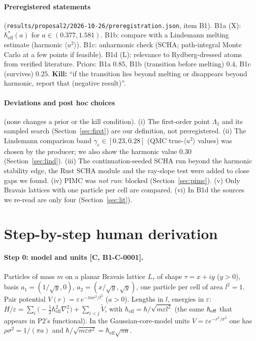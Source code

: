 \documentclass[10pt]{article}
\newcommand{\tier}[1]{\textsf{[#1]}}
\newcommand{\hb}{\hbar_{\mathrm{eff}}}
\begin{document}
\paragraph{Preregistered statements} (\texttt{results/proposal2/2026-10-26/preregistration.json}, item B1). B1a (X): $\hb^*(a)$ for $a\in(0.377,1.581)$. B1b: compare with a Lindemann melting estimate (harmonic $\langle u^2\rangle$).
B1c: anharmonic check (SCHA; path-integral Monte Carlo at a few points if feasible). B1d (L): relevance to Rydberg-dressed atoms from verified literature. Priors: B1a $0.85$, B1b (transition before melting) $0.4$, B1c (survives) $0.25$.
\textbf{Kill:} ``if the transition lies beyond melting or disappears beyond harmonic, report that (negative result)''.

\paragraph{Deviations and post hoc choices} (none changes a prior or the kill condition). (i) The first-order point $\Lambda_1$ and its sampled search (Section~\ref{sec:first}) are our definition, not preregistered. (ii) The Lindemann comparison band
$\gamma_c\in[0.23,0.28]$ (QMC true-$\langle u^2\rangle$ values) was chosen by the producer; we also show the harmonic value $0.30$ (Section~\ref{sec:lind}). (iii) The continuation-seeded SCHA run beyond the harmonic stability edge, the Rust SCHA module and the ray-slope test
were added to close gaps we found. (iv) PIMC was \emph{not run}: blocked (Section~\ref{sec:pimc}). (v) Only Bravais lattices with one particle per cell are compared. (vi) In B1d the sources we re-read are only four (Section~\ref{sec:lit}).

\section{Step-by-step human derivation}\label{sec:human}
\paragraph{Step 0: model and units \tier{C, B1-C-0001}.} Particles of mass $m$ on a planar Bravais lattice $L_\tau$ of shape $\tau=x+iy$ ($y>0$), basis $a_1=(1/\sqrt y,0)$, $a_2=(x/\sqrt y,\sqrt y)$, one particle per cell of area $l^2=1$.
Pair potential $V(r)=\varepsilon\,e^{-\pi a r^2/l^2}$ ($a>0$). Lengths in $l$, energies in $\varepsilon$: $H/\varepsilon=\sum_i\bigl(-\tfrac12\hb^2\nabla_i^2\bigr)+\sum_{i<j}\tilde V$, with $\hb=\hbar/\sqrt{m\varepsilon l^2}$
(the same $\hbar_{\rm eff}$ that appears in P2's functional). In the Gaussian-core-model units $V=\varepsilon e^{-r^2/\sigma^2}$ one has $\rho\sigma^2=1/(\pi a)$ and $\hbar/\sqrt{m\varepsilon\sigma^2}=\hb\sqrt{\pi a}$.
\end{document}
